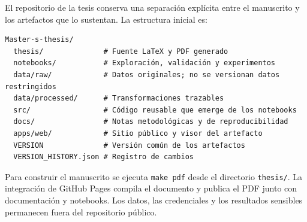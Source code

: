 El repositorio de la tesis conserva una separación explícita entre el manuscrito y los artefactos que lo sustentan. La estructura inicial es:

\begin{verbatim}
Master-s-thesis/
  thesis/              # Fuente LaTeX y PDF generado
  notebooks/           # Exploración, validación y experimentos
  data/raw/            # Datos originales; no se versionan datos restringidos
  data/processed/      # Transformaciones trazables
  src/                 # Código reusable que emerge de los notebooks
  docs/                # Notas metodológicas y de reproducibilidad
  apps/web/            # Sitio público y visor del artefacto
  VERSION              # Versión común de los artefactos
  VERSION_HISTORY.json # Registro de cambios
\end{verbatim}

Para construir el manuscrito se ejecuta \texttt{make pdf} desde el directorio \texttt{thesis/}. La integración de GitHub Pages compila el documento y publica el PDF junto con documentación y notebooks. Los datos, las credenciales y los resultados sensibles permanecen fuera del repositorio público.
